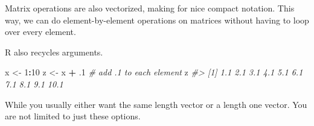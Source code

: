 \documentclass[]{book}
\newenvironment{Shaded}{\begin{snugshade}}{\end{snugshade}}
\newcommand{\KeywordTok}[1]{\textcolor[rgb]{0.13,0.29,0.53}{\textbf{#1}}}
\newcommand{\DecValTok}[1]{\textcolor[rgb]{0.00,0.00,0.81}{#1}}
\newcommand{\StringTok}[1]{\textcolor[rgb]{0.31,0.60,0.02}{#1}}
\newcommand{\CommentTok}[1]{\textcolor[rgb]{0.56,0.35,0.01}{\textit{#1}}}
\newcommand{\OperatorTok}[1]{\textcolor[rgb]{0.81,0.36,0.00}{\textbf{#1}}}
\newcommand{\NormalTok}[1]{#1}
\theoremstyle{definition}
\theoremstyle{definition}
\theoremstyle{definition}
\theoremstyle{remark}
\begin{document}
Matrix operations are also vectorized, making for nice compact notation.
This way, we can do element-by-element operations on matrices without
having to loop over every element.

\begin{Shaded}
\end{Shaded}

R also recycles arguments.

\begin{Shaded}
\begin{Highlighting}[]
\NormalTok{x <-}\StringTok{ }\DecValTok{1}\OperatorTok{:}\DecValTok{10}
\NormalTok{z <-}\StringTok{ }\NormalTok{x }\OperatorTok{+}\StringTok{ }\NormalTok{.}\DecValTok{1}  \CommentTok{# add .1 to each element}
\NormalTok{z}
\CommentTok{#>  [1]  1.1  2.1  3.1  4.1  5.1  6.1  7.1  8.1  9.1 10.1}
\end{Highlighting}
\end{Shaded}

While you usually either want the same length vector or a length one
vector. You are not limited to just these options.
\end{document}
